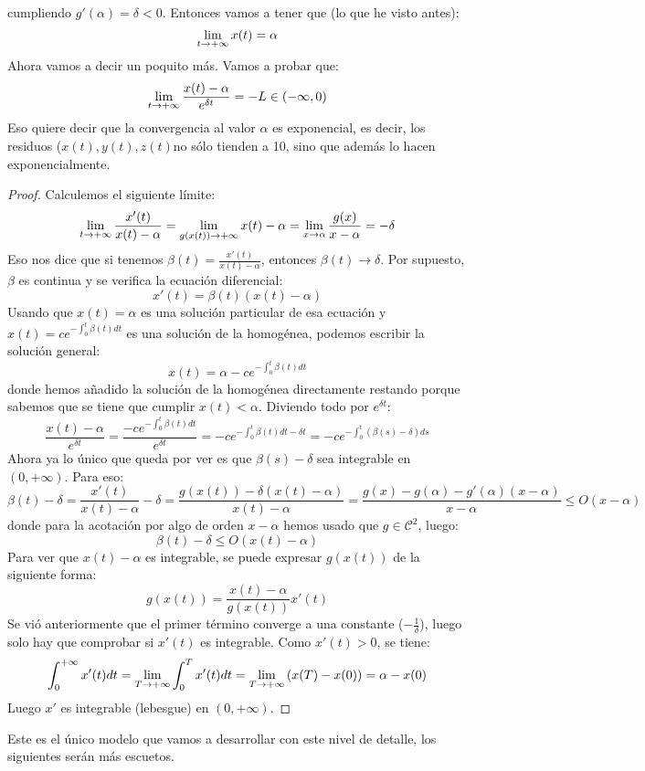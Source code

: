 cumpliendo $g'(\alpha)=\delta<0$. Entonces vamos a tener que (lo que he visto antes):
\[
\displaystyle\lim_{  t  \to +\infty }  x(t) =\alpha
\]
Ahora vamos a decir un poquito más. Vamos a probar que:
\[
\displaystyle\lim_{  t  \to +\infty }  \frac{x(t)-\alpha}{e^{\delta t}} =-L\in(-\infty,0)
\]
Eso quiere decir que la convergencia al valor $\alpha$ es exponencial, es decir, los residuos ($x(t),y(t),z(t)$no sólo tienden a 10, sino que además lo hacen exponencialmente.
\begin{proof}
Calculemos el siguiente límite:
\[
\displaystyle\lim_{  t  \to +\infty }  \frac{x'(t)}{x(t)-\alpha} =\displaystyle\lim_{  g(x(t))  \to +\infty }  x(t)-\alpha =\displaystyle\lim_{ x \to \alpha } \frac{g(x)}{x-\alpha}=-\delta
\]
Eso nos dice que si tenemos $\beta(t)=\frac{x'(t)}{x(t)-\alpha}$, entonces $\beta(t)\longrightarrow \delta$. Por supuesto, $\beta$ es continua y se verifica la ecuación diferencial:
\[
x'(t)= \beta(t)(x(t)-\alpha)
\]
Usando que $x(t)=\alpha$ es una solución particular de esa ecuación y $x(t)=ce^{-\int_0^t\beta(t)dt}$ es una solución de la homogénea, podemos escribir la solución general:
\[
x(t)=\alpha-ce^{-\int_0^t\beta(t)dt}
\]
donde hemos añadido la solución de la homogénea directamente restando porque sabemos que se tiene que cumplir $x(t)<\alpha$. Diviendo todo por $e^{\delta t}$:
\[
\frac{x(t)-\alpha}{e^{\delta t}}=\frac{-ce^{-\int_0^t\beta(t)dt}}{e^{\delta t}}=-ce^{-\int_0^t\beta(t)dt-\delta t}=-ce^{-\int_0^t\left(\beta(s)-\delta \right)ds}
\]
Ahora ya lo único que queda por ver es que $\beta(s)-\delta$ sea integrable en $(0,+\infty)$. Para eso:
\[
\beta(t)-\delta=\frac{x'(t)}{x(t)-\alpha}-\delta=\frac{g(x(t))-\delta(x(t)-\alpha)}{x(t)-\alpha}=\frac{g(x)-g(\alpha)-g'(\alpha)(x-\alpha) }{x-\alpha}\leq O(x-\alpha)
\]
donde para la acotación por algo de orden $x-\alpha$ hemos usado que $g\in\mathcal{C}^2$, luego:
\[
\beta(t)-\delta\leq O(x(t)-\alpha)
\]
Para ver que $x(t)-\alpha$ es integrable, se puede expresar $g(x(t))$ de la siguiente forma:
\[
g(x(t))=\frac{x(t)-\alpha}{g(x(t))}x'(t)
\]
Se vió anteriormente que el primer término converge a una constante ($-\frac{1}{\delta}$), luego solo hay que comprobar si $x'(t)$ es integrable. Como $x'(t)>0$, se tiene:
\[
\displaystyle\int_{ 0 }^{ +\infty } x'(t)dt=\displaystyle\lim_{  T  \to +\infty }  \displaystyle\int_{ 0 }^{ T } x'(t)dt =
\displaystyle\lim_{  T  \to +\infty }  \left(x(T)-x(0)\right) =\alpha-x(0)
\]
Luego $x'$ es integrable (lebesgue) en $(0,+\infty)$.
\end{proof}

Este es el único modelo que vamos a desarrollar con este nivel de detalle, los siguientes serán más escuetos.

